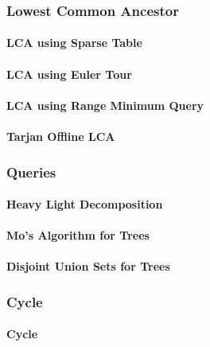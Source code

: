 \documentclass[8pt]{article}
\begin{document}
\subsubsection{Lowest Common Ancestor}
\paragraph{LCA using Sparse Table}

\paragraph{LCA using Euler Tour}

\paragraph{LCA using Range Minimum Query}

\paragraph{Tarjan Offline LCA}


\subsubsection{Queries}
\paragraph{Heavy Light Decomposition}

\paragraph{Mo's Algorithm for Trees}

\paragraph{Disjoint Union Sets for Trees}


\subsubsection{Cycle}
\paragraph{Cycle}

\end{document}
